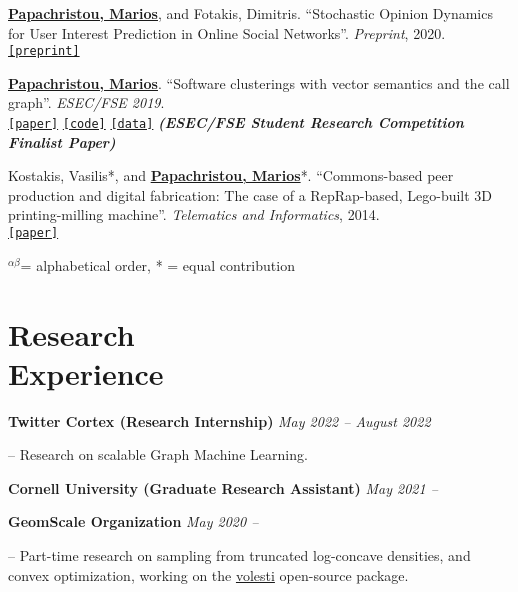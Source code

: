 \documentclass[margin]{res}
\newcommand{\alphabeticalorder}[0]{\ensuremath {^{\alpha \beta}}}
\newcommand{\specialurl}[2]{\href {#2} {\texttt{[#1]}}}
\newcommand{\preprint}[1]{\specialurl {preprint} {#1}}
\newcommand{\code}[1]{\specialurl {code} {#1}}
\newcommand{\data}[1]{\specialurl {data} {#1}}
\newcommand{\paper}[1]{\specialurl {paper} {#1}}
\newcommand{\authorref}[1]{\underline {\textbf{#1}}}
\newcommand{\authorme}{\authorref{Papachristou, Marios}}
\begin{document}
\begin{resume}
\begin{compactenum}
    \item \authorme, and Fotakis, Dimitris. ``Stochastic Opinion Dynamics for User Interest Prediction in Online Social Networks''.  \emph{Preprint}, 2020. \\ \preprint{https://www.researchgate.net/publication/353006940_Stochastic_Opinion_Dynamics_for_Interest_Prediction_in_Social_Networks}
    \item \authorme. ``Software clusterings with vector semantics and the call graph''. \emph{ESEC/FSE 2019}. \\ \paper{https://dl.acm.org/citation.cfm?id=3342483} \code{https://github.com/papachristoumarios/sade} \data{http://doi.org/10.5281/zenodo.2652487} \textbf{\emph{(ESEC/FSE Student Research Competition Finalist Paper)}}
    \item Kostakis, Vasilis*, and \authorme*. ``Commons-based peer production and digital fabrication: The case of a RepRap-based, Lego-built 3D printing-milling machine''. \emph{Telematics and Informatics}, 2014. \\ \paper{https://bit.ly/2JRoisV} 
    
\end{compactenum}

{
\footnotesize
\alphabeticalorder  = alphabetical order, * = equal contribution
}

\section{Research \\ Experience}

\textbf{Twitter Cortex (Research Internship)} \hfill \emph{May 2022 -- August 2022}
\begin{compactitem}
\item[--] Research on scalable Graph Machine Learning. 
\end{compactitem}

\textbf{Cornell University (Graduate Research Assistant)} \hfill \emph{May 2021 --}

\textbf{GeomScale Organization} \hfill \emph{May 2020 --}

\begin{compactitem}
	\item[--] Part-time research on sampling from truncated log-concave densities, and convex optimization, working on the \href{https://github.com/GeomScale/volesti}{volesti} open-source package.
\end{compactitem}




\end{resume}
\end{document}
